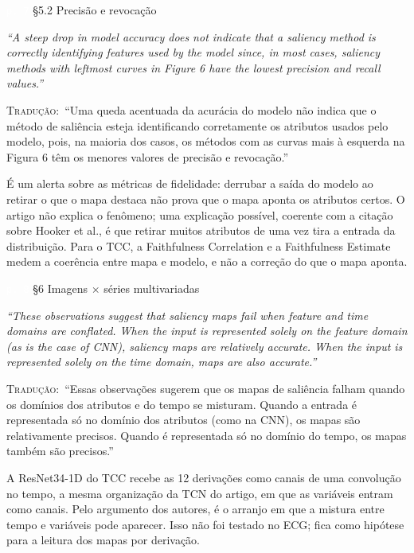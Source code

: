 \documentclass[11pt,a4paper]{article}
\newcommand{\pagechip}[1]{{\setlength{\fboxsep}{1.5pt}\colorbox{cAcc}{\textcolor{white}{\scriptsize\texttt{#1}}}}}
\newenvironment{origquote}{\par\itshape\small}{\par}
\newenvironment{tradquote}{\par\small\textsc{Tradução:}\ }{\par}
\newcommand{\explab}[1]{\par\smallskip{\small\color{cAcc}\textbf{\MakeUppercase{#1}}}\par}
\begin{document}
\begin{citacard}{\pagechip{p. 7} §5.2 Precisão e revocação}
\begin{origquote}“A steep drop in model accuracy does not indicate that a saliency method is correctly identifying features used by the model since, in most cases, saliency methods with leftmost curves in Figure 6 have the lowest precision and recall values.”\end{origquote}
\begin{tradquote}“Uma queda acentuada da acurácia do modelo não indica que o método de saliência esteja identificando corretamente os atributos usados pelo modelo, pois, na maioria dos casos, os métodos com as curvas mais à esquerda na Figura 6 têm os menores valores de precisão e revocação.”\end{tradquote}
\explab{Explicação}
É um alerta sobre as métricas de fidelidade: derrubar a saída do modelo ao retirar o que o mapa destaca não prova que o mapa aponta os atributos certos. O artigo não explica o fenômeno; uma explicação possível, coerente com a citação sobre Hooker et al., é que retirar muitos atributos de uma vez tira a entrada da distribuição. Para o TCC, a Faithfulness Correlation e a Faithfulness Estimate medem a coerência entre mapa e modelo, e não a correção do que o mapa aponta.
\end{citacard}

\begin{citacard}{\pagechip{p. 8} §6 Imagens $\times$ séries multivariadas}
\begin{origquote}“These observations suggest that saliency maps fail when feature and time domains are conflated. When the input is represented solely on the feature domain (as is the case of CNN), saliency maps are relatively accurate. When the input is represented solely on the time domain, maps are also accurate.”\end{origquote}
\begin{tradquote}“Essas observações sugerem que os mapas de saliência falham quando os domínios dos atributos e do tempo se misturam. Quando a entrada é representada só no domínio dos atributos (como na CNN), os mapas são relativamente precisos. Quando é representada só no domínio do tempo, os mapas também são precisos.”\end{tradquote}
\explab{Explicação}
A ResNet34-1D do TCC recebe as 12 derivações como canais de uma convolução no tempo, a mesma organização da TCN do artigo, em que as variáveis entram como canais. Pelo argumento dos autores, é o arranjo em que a mistura entre tempo e variáveis pode aparecer. Isso não foi testado no ECG; fica como hipótese para a leitura dos mapas por derivação.
\end{citacard}
\end{document}
